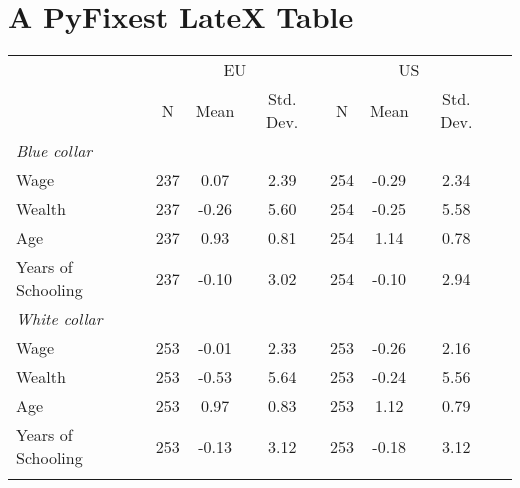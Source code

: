 \documentclass{article}%
\begin{document}
%
\normalsize%
\section{A PyFixest LateX Table}%
\label{sec:APyFixestLateXTable}%


\begin{table}[htbp]%
\renewcommand\cellalign{t}
\begin{threeparttable}
\begin{tabular}{lccccccc}
\toprule
 & \multicolumn{3}{c}{EU} & \multicolumn{3}{c}{US} \\
\cmidrule(lr){2-4} \cmidrule(lr){5-7} 
 & N & Mean & Std. Dev. & N & Mean & Std. Dev. \\
\midrule
\addlinespace
\emph{Blue collar} \\
\addlinespace
Wage & 237 & 0.07 & 2.39 & 254 & -0.29 & 2.34 \\
Wealth & 237 & -0.26 & 5.60 & 254 & -0.25 & 5.58 \\
Age & 237 & 0.93 & 0.81 & 254 & 1.14 & 0.78 \\
Years of Schooling & 237 & -0.10 & 3.02 & 254 & -0.10 & 2.94 \\
\addlinespace
\midrule
\addlinespace
\emph{White collar} \\
\addlinespace
Wage & 253 & -0.01 & 2.33 & 253 & -0.26 & 2.16 \\
Wealth & 253 & -0.53 & 5.64 & 253 & -0.24 & 5.56 \\
Age & 253 & 0.97 & 0.83 & 253 & 1.12 & 0.79 \\
Years of Schooling & 253 & -0.13 & 3.12 & 253 & -0.18 & 3.12 \\
\addlinespace
\bottomrule
\end{tabular}
\footnotesize 
\end{threeparttable}%
\end{table}

%
\end{document}
